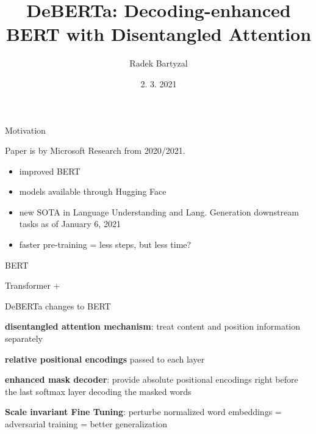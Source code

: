 \documentclass{beamer}
\begin{document}
\title[DeBERTa]{DeBERTa: Decoding-enhanced BERT with Disentangled Attention}  
\author{Radek Bartyzal}
\date{2. 3. 2021} 

\frame{\titlepage} 

\begin{frame}{Motivation}

Paper is by Microsoft Research from 2020/2021.
\vfill

\begin{itemize}
\item improved BERT
\item models available through Hugging Face
\item new SOTA in Language Understanding and Lang. Generation downstream tasks as of January 6, 2021
\item faster pre-training = less steps, but less time?
\end{itemize}


\end{frame}
\begin{frame}{BERT}

Transformer + 

\end{frame}
\begin{frame}{DeBERTa changes to BERT}


\textbf{disentangled attention mechanism}: treat content and position information separately

\vfill

\textbf{relative positional encodings} passed to each layer

\vfill

\textbf{enhanced mask decoder}: provide absolute positional encodings right before the last softmax layer decoding the masked words

\vfill

\textbf{Scale invariant Fine Tuning}: perturbe normalized word embeddings = adversarial training = better generalization

\end{frame}
\end{document}
